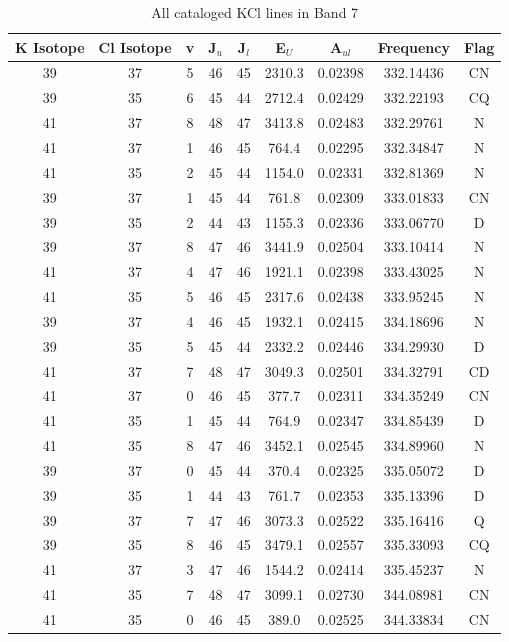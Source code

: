 \begin{table*}[htp]
\centering
\caption{All cataloged KCl lines in Band 7}
\begin{tabular}{ccccccccc}
\label{tab:K_detections_B7}
K Isotope & Cl Isotope & v & J$_u$ & J$_l$ & E$_U$ & A$_{ul}$ & Frequency & Flag \\
\hline
39 & 37 & 5 & 46 & 45 & 2310.3 & 0.02398 & 332.14436 & CN \\
39 & 35 & 6 & 45 & 44 & 2712.4 & 0.02429 & 332.22193 & CQ \\
41 & 37 & 8 & 48 & 47 & 3413.8 & 0.02483 & 332.29761 & N \\
41 & 37 & 1 & 46 & 45 & 764.4 & 0.02295 & 332.34847 & N \\
41 & 35 & 2 & 45 & 44 & 1154.0 & 0.02331 & 332.81369 & N \\
39 & 37 & 1 & 45 & 44 & 761.8 & 0.02309 & 333.01833 & CN \\
39 & 35 & 2 & 44 & 43 & 1155.3 & 0.02336 & 333.06770 & D \\
39 & 37 & 8 & 47 & 46 & 3441.9 & 0.02504 & 333.10414 & N \\
41 & 37 & 4 & 47 & 46 & 1921.1 & 0.02398 & 333.43025 & N \\
41 & 35 & 5 & 46 & 45 & 2317.6 & 0.02438 & 333.95245 & N \\
39 & 37 & 4 & 46 & 45 & 1932.1 & 0.02415 & 334.18696 & N \\
39 & 35 & 5 & 45 & 44 & 2332.2 & 0.02446 & 334.29930 & D \\
41 & 37 & 7 & 48 & 47 & 3049.3 & 0.02501 & 334.32791 & CD \\
41 & 37 & 0 & 46 & 45 & 377.7 & 0.02311 & 334.35249 & CN \\
41 & 35 & 1 & 45 & 44 & 764.9 & 0.02347 & 334.85439 & D \\
41 & 35 & 8 & 47 & 46 & 3452.1 & 0.02545 & 334.89960 & N \\
39 & 37 & 0 & 45 & 44 & 370.4 & 0.02325 & 335.05072 & D \\
39 & 35 & 1 & 44 & 43 & 761.7 & 0.02353 & 335.13396 & D \\
39 & 37 & 7 & 47 & 46 & 3073.3 & 0.02522 & 335.16416 & Q \\
39 & 35 & 8 & 46 & 45 & 3479.1 & 0.02557 & 335.33093 & CQ \\
41 & 37 & 3 & 47 & 46 & 1544.2 & 0.02414 & 335.45237 & N \\
41 & 35 & 7 & 48 & 47 & 3099.1 & 0.02730 & 344.08981 & CN \\
41 & 35 & 0 & 46 & 45 & 389.0 & 0.02525 & 344.33834 & CN \\

\end{tabular}
\end{table*}
